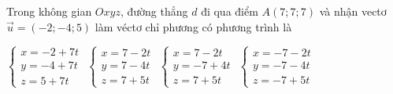 \documentclass[12pt,a4paper]{article}
\begin{document}
\begin{ex}
 Trong không gian ${Oxyz}$, đường thẳng ${d}$ đi qua điểm ${A(7;7;7)}$ và nhận vectơ $\vec{u}=(-2;-4;5)$ làm véctơ chỉ phương có phương trình là
 
\choice
{ $\left\{ \begin{array}{l}x = -2+7t\\ y = -4+7t\\z = 5+7t\end{array} \right.$ }
   { \True $\left\{ \begin{array}{l}x = 7-2t\\ y = 7-4t\\z = 7+5t\end{array} \right.$ }
     { $\left\{ \begin{array}{l}x = 7-2t\\ y = -7+4t\\z = 7+5t\end{array} \right.$ }
    { $\left\{ \begin{array}{l}x = -7-2t\\ y = -7-4t\\z = -7+5t\end{array} \right.$ }
\end{ex}
\end{document}
